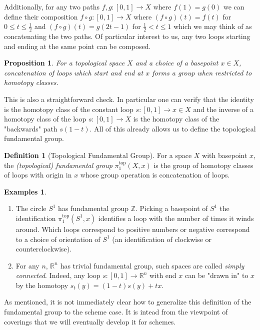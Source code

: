 \documentclass{article}
\theoremstyle{definition}
\newtheorem{definition}[theorem]{Definition}
\newtheorem{examples}[theorem]{Examples}
\theoremstyle{remark}
\theoremstyle{plain}
\newtheorem{proposition}[theorem]{Proposition}
\newcommand{\R}{\mathbb{R}}
\newcommand{\Z}{\mathbb{Z}}
\begin{document}
\indent Additionally, for any two paths $f,g: [0,1] \to X$ where $f(1) = g(0)$ we can define their composition $f \circ g: [0,1] \to X$ where $(f \circ g )(t) = f(t)$ for $0 \leq t \leq \frac{1}{2}$ and $(f \circ g)(t) = g(2t - 1)$ for $ \frac{1}{2} < t \leq 1$ which we may think of as concatenating the two paths.
Of particular interest to us, any two loops starting and ending at the same point can be composed.

\begin{proposition}
	For a topological space $X$ and a choice of a basepoint $x \in X$, concatenation of loops which start and end at $x$ forms a group when restricted to homotopy classes.
\end{proposition}

This is also a straightforward check. 
In particular one can verify that the identity is the homotopy class of the constant loop $s: [0,1] \to x \in X$ and the inverse of a homotopy class of the loop $s: [0,1] \to X$ is the homotopy class of the "backwards" path $s(1-t)$.
All of this already allows us to define the topological fundamental group.
\begin{definition}[Topological Fundamental Group]
	For a space $X$ with basepoint $x$, the \textit{(topological) fundamental group} $\pi^{\text{top}}_1(X,x)$	is the group of homotopy classes of loops with origin in $x$ whose group operation is concatenation of loops.
\end{definition}

\begin{examples} \text{} 
	\begin{enumerate}
		\item The circle $S^1$ has fundamental group $\Z$. 
			Picking a basepoint of $S^1$ the identification $\pi_1^{\text{top}}(S^1,x)$ identifies a loop with the number of times it winds around.
			Which loops correspond to positive numbers or negative correspond to a choice of orientation of $S^1$ (an identification of clockwise or counterclockwise). 
		\item For any $n$, $\R^n$ has trivial fundamental group, such spaces are called \textit{simply connected}.
			Indeed, any loop $s: [0,1] \to \R^n$ with end $x$ can be "drawn in" to $x$ by the homotopy $s_t(y) = (1-t)s(y) + tx$.
	\end{enumerate}
	
\end{examples}

As mentioned, it is not immediately clear how to generalize this definition of the fundamental group to the scheme case.
It is intead from the viewpoint of coverings that we will eventually develop it for schemes.
\end{document}
